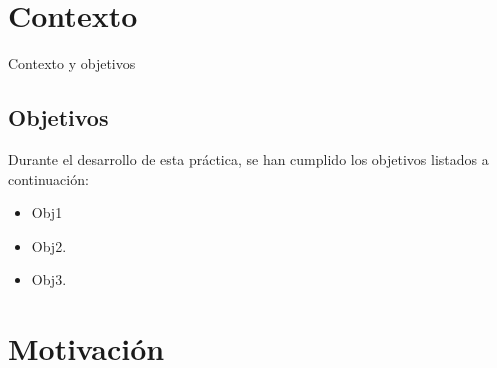 \section{Contexto}

Contexto y objetivos

\subsection{Objetivos}

Durante el desarrollo de esta práctica, se han cumplido los objetivos listados a continuación:
\begin{itemize}
   \item Obj1
   \item Obj2.
   \item Obj3.
\end{itemize}

\section{Motivación}

